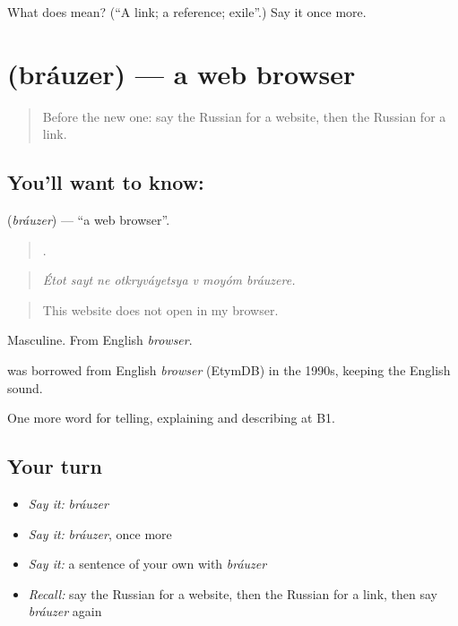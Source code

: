 \begin{tcolorbox}[breakable,colback=teal!4,colframe=teal!35!black,title={Before you move on}]
What does  mean? (\textquotedblleft{}A link; a reference; exile\textquotedblright{}.) Say it once more.
\end{tcolorbox}
\section[\texorpdfstring{\ru{браузер} (bráuzer)}{браузер (bráuzer)}]{ (bráuzer) — a web browser}

\label{lesson:RU-C399-brauzer}



\begin{quote}
Before the new one: say the Russian for a website, then the Russian for a link.
\end{quote}

\subsection*{You'll want to know: }
\textbf{} (\emph{bráuzer}) — \textquotedblleft{}a web browser\textquotedblright{}.

\begin{quote}
      .
\end{quote}

\begin{quote}
\emph{Étot sayt ne otkryváyetsya v moyóm bráuzere.}
\end{quote}

\begin{quote}
This website does not open in my browser.
\end{quote}

Masculine. From English \emph{browser}.

\begin{cousinweb}
\textbf{} was borrowed from English \emph{browser} (EtymDB) in the 1990s, keeping the English sound.
\end{cousinweb}

\begin{grammarlens}[title={What you've built}]
One more word for telling, explaining and describing at B1.
\end{grammarlens}

\subsection*{Your turn}
\begin{itemize}
\raggedright
  \item \emph{Say it:} \emph{bráuzer}
  \item \emph{Say it:} \emph{bráuzer}, once more
  \item \emph{Say it:} a sentence of your own with \emph{bráuzer}
  \item \emph{Recall:} say the Russian for a website, then the Russian for a link, then say \emph{bráuzer} again
\end{itemize}

